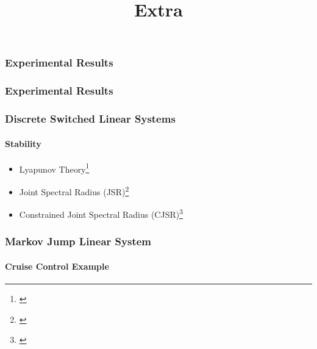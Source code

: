 \title[PhD Defence]{%
    {\Huge Extra}
}
\author[Nils Vreman]{}
\date[]{}
\notitlelogo{}

\begin{frame}
    \begin{figure}
        \only<2>{}%
        \only<3>{}%
    \end{figure}
\end{frame}


\begin{frame}
    \frametitle{Experimental Results}
    \begin{figure}[h]
        \centering
        \resizebox{0.85\textwidth}{!}{}
    \end{figure}
\end{frame}


\begin{frame}
    \frametitle{Experimental Results}
    \begin{figure}[h]
        \centering
        \resizebox{0.9\textwidth}{!}{}
    \end{figure}
    \hspace{2.3cm}
\end{frame}


\begin{frame}
    \frametitle{Discrete Switched Linear Systems}
    \framesubtitle{Stability}
    \begin{itemize}\setlength\itemsep{1em}
        \item Lyapunov Theory\footnote{\cite{Liberzon:2003, Linsenmayer:2021, Hertneck:2021}}
        \item Joint Spectral Radius (JSR)\footnote{\cite{Maggio:2020, Ogura:2013}}
        \item Constrained Joint Spectral Radius (CJSR)\footnote{\cite{Dai:2012}}
    \end{itemize}
\end{frame}


\begin{frame}
    \frametitle{Markov Jump Linear System}%
    \framesubtitle{Cruise Control Example}
    \begin{figure}
        \centering
        
    \end{figure}
\end{frame}
